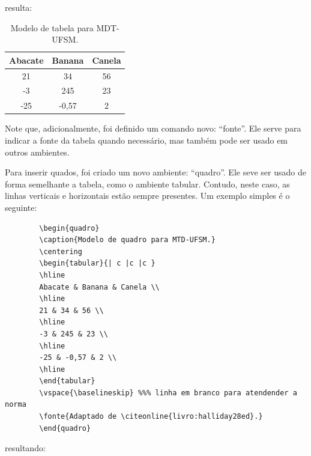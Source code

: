 \documentclass[oneside,openright,12pt]{ufsm_2015} %
\begin{document}
         \noindent resulta:
         
         \begin{table}[ht]
         \centering
         \caption{Modelo de tabela para MDT-UFSM.}
         \begin{tabular}{ c c c }
         \hline
         Abacate & Banana & Canela \\
         \hline
         21 & 34 & 56 \\
         -3 & 245 & 23 \\
         -25 & -0,57 & 2 \\
         \hline
         \end{tabular}
         \vspace{\baselineskip} %
         \end{table}
         
         \par Note que, adicionalmente, foi definido um comando novo: ``fonte''. Ele serve para indicar a fonte da tabela quando necessário, mas também pode ser usado em outros ambientes.
         
         \par Para inserir quados, foi criado um novo ambiente: ``quadro''. Ele seve ser usado de forma semelhante a tabela, como o ambiente tabular. Contudo, neste caso, as linhas verticais e horizontais estão sempre presentes. Um exemplo simples é o seguinte: 
         
         
         \begin{verbatim}
	    \begin{quadro}
   	    \caption{Modelo de quadro para MTD-UFSM.}
	    \centering
	    \begin{tabular}{| c |c |c }
	    \hline
	    Abacate & Banana & Canela \\
	    \hline
	    21 & 34 & 56 \\
	    \hline
	    -3 & 245 & 23 \\
	    \hline
	    -25 & -0,57 & 2 \\
	    \hline
	    \end{tabular}
	    \vspace{\baselineskip} %%% linha em branco para atendender a norma
	    \fonte{Adaptado de \citeonline{livro:halliday28ed}.}
	    \end{quadro}
         \end{verbatim}
         
         \noindent resultando:
         
\end{document}
